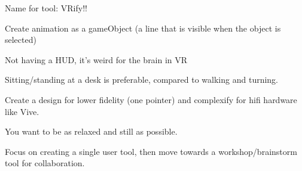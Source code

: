 Name for tool: VRify!!

Create animation as a gameObject (a line that is visible when the object is selected)

Not having a HUD, it's weird for the brain in VR

Sitting/standing at a desk is preferable, compared to walking and turning.

Create a design for lower fidelity (one pointer) and complexify for hifi hardware like Vive.

You want to be as relaxed and still as possible.

Focus on creating a single user tool, then move towards a workshop/brainstorm tool for collaboration.
